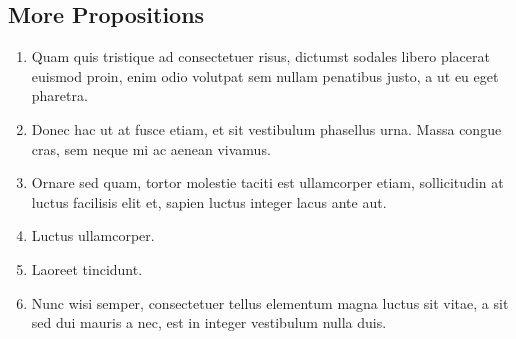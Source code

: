\documentclass[10pt,a4paper,oneside]{alb-latex}
\begin{document}
%

\subsection{More Propositions}
\label{sec:alb-latex-article:more-prop}

\begin{enumerate}
\item Quam quis tristique ad consectetuer risus, dictumst sodales libero
  placerat euismod proin, enim odio volutpat sem nullam penatibus justo,
  a ut eu eget pharetra.
\item Donec hac ut at fusce etiam, et sit vestibulum phasellus
  urna. Massa congue cras, sem neque mi ac aenean vivamus.
\item Ornare sed quam, tortor molestie taciti est ullamcorper etiam,
  sollicitudin at luctus facilisis elit et, sapien luctus integer lacus
  ante aut.
\item Luctus ullamcorper.
\item Laoreet tincidunt.
\item Nunc wisi semper, consectetuer tellus elementum magna luctus sit
  vitae, a sit sed dui mauris a nec, est in integer vestibulum nulla
  duis.
\end{enumerate}
\end{document}
